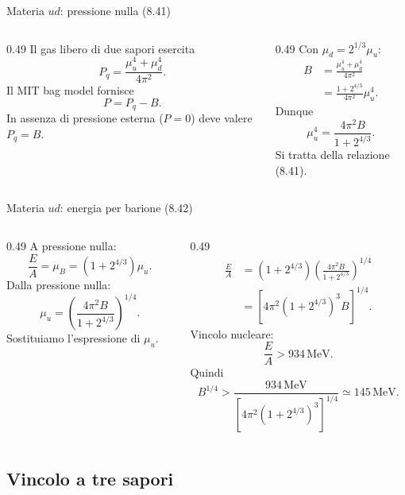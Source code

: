 \begin{frame}{Materia $ud$: pressione nulla (8.41)}
\small
\begin{columns}[T,onlytextwidth]
\begin{column}{0.49\textwidth}
Il gas libero di due sapori esercita
\[
P_q=\frac{\mu_u^4+\mu_d^4}{4\pi^2}.
\]
Il MIT bag model fornisce
\[
P=P_q-B.
\]
In assenza di pressione esterna
($P=0$) deve valere $P_q=B$.
\end{column}
\begin{column}{0.49\textwidth}
Con $\mu_d=2^{1/3}\mu_u$:
\begin{align*}
B&=\frac{\mu_u^4+\mu_d^4}{4\pi^2}\\
&=\frac{1+2^{4/3}}{4\pi^2}\mu_u^4.
\end{align*}
Dunque
\[
\mu_u^4=\frac{4\pi^2B}{1+2^{4/3}}.
\]
Si tratta della relazione (8.41).
\end{column}
\end{columns}
\end{frame}

\begin{frame}{Materia $ud$: energia per barione (8.42)}
\small
\begin{columns}[T,onlytextwidth]
\begin{column}{0.49\textwidth}
A pressione nulla:
\[
\frac EA=\mu_B=(1+2^{4/3})\mu_u.
\]
Dalla pressione nulla:
\[
\mu_u=\left(
\frac{4\pi^2B}{1+2^{4/3}}
\right)^{1/4}.
\]
Sostituiamo l'espressione di $\mu_u$.
\end{column}
\begin{column}{0.49\textwidth}
\begin{align*}
\frac EA
&=(1+2^{4/3})
\left(\frac{4\pi^2B}{1+2^{4/3}}\right)^{1/4}\\[2pt]
&=\left[4\pi^2(1+2^{4/3})^3B\right]^{1/4}.
\end{align*}
Vincolo nucleare:
\[
\frac EA>934\,\mathrm{MeV}.
\]
Quindi
\[
B^{1/4}>\frac{934\,\mathrm{MeV}}
{[4\pi^2(1+2^{4/3})^3]^{1/4}}
\simeq145\,\mathrm{MeV}.
\]
\end{column}
\end{columns}
\end{frame}

\subsection{Vincolo a tre sapori}

